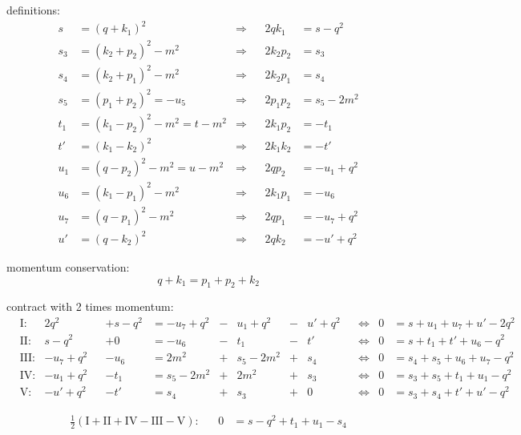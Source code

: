 \documentclass[
  ngerman,		%
  a4paper,		%
  11pt,			%
  DIV=12,		%
  parskip=half  	%
]{scrartcl}
\begin{document}
definitions:
\begin{align}
s &= (q+k_1)^2 &\Rightarrow& &2qk_1 &= s-q^2\\
s_3 &= (k_2+p_2)^2-m^2  &\Rightarrow& &2k_2p_2 &= s_3\\
s_4 &= (k_2+p_1)^2-m^2  &\Rightarrow& &2k_2p_1 &= s_4\\
s_5 &= (p_1+p_2)^2 = -u_5  &\Rightarrow& &2p_1p_2 &= s_5-2m^2\\
t_1 &= (k_1-p_2)^2-m^2 = t - m^2  &\Rightarrow& &2k_1p_2 &=-t_1\\
t' &= (k_1-k_2)^2  &\Rightarrow& &2k_1k_2 &= -t'\\
u_1 &= (q-p_2)^2-m^2 = u - m^2  &\Rightarrow& &2qp_2 &=-u_1+q^2\\
u_6 &= (k_1-p_1)^2 - m^2  &\Rightarrow& &2k_1p_1 &=-u_6\\
u_7 &= (q-p_1)^2 - m^2  &\Rightarrow& &2qp_1 &=-u_7+q^2\\
u' &= (q-k_2)^2  &\Rightarrow& &2qk_2 &=-u'+q^2
\end{align}

momentum conservation:
\begin{equation}
q+k_1 = p_1+p_2+k_2
\end{equation}

contract with 2 times momentum:
\begin{align}
&\text{I:} &2q^2 && +s-q^2 &=-u_7+q^2 &-& u_1+q^2 &-& u'+q^2 &&\Leftrightarrow &0 &=s+u_1+u_7+u'-2q^2\\
&\text{II:} &s-q^2 && +0 &= -u_6 &-& t_1 &-& t' &&\Leftrightarrow &0 &= s+t_1+t'+u_6-q^2\\
&\text{III:} &-u_7+q^2 && -u_6 &= 2m^2 &+& s_5-2m^2 &+& s_4 &&\Leftrightarrow &0 &= s_4+s_5+u_6+u_7-q^2\\
&\text{IV:} &-u_1+q^2 && -t_1 &= s_5-2m^2 &+& 2m^2 &+& s_3 &&\Leftrightarrow &0 &= s_3+s_5+t_1+u_1-q^2\\
&\text{V:} &-u'+q^2 && -t' &= s_4 &+& s_3 &+& 0 &&\Leftrightarrow &0 &= s_3+s_4+t'+u'-q^2
\end{align}

\begin{align}
\frac 1 2 \left(\text{I} + \text{II} + \text{IV} - \text{III} - \text{V}\right): & &0&= s - q^2 + t_1 + u_1 - s_4
\end{align}
\end{document}
